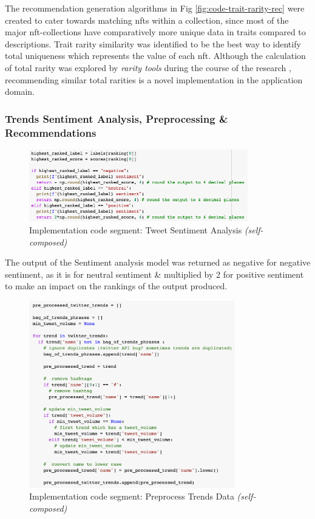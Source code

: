 The recommendation generation algorithms in Fig \ref{fig:code-trait-rarity-rec} were created to cater towards matching \gls{nft}s within a collection, since most of the major \gls{nft}-collections have comparatively more unique data in traits compared to descriptions. Trait rarity similarity was identified to be the best way to identify total uniqueness which represents the value of each \gls{nft}. Although the calculation of total rarity was explored by \textit{rarity tools} during the course of the research \autocite{raritytools_introducing_2021,raritytools_ranking_2021}, recommending similar total rarities is a novel implementation in the application domain.

\subsubsection{Trends Sentiment Analysis, Preprocessing \& Recommendations}

\begin{figure}[h!]
\centering
\includegraphics[width=0.85\textwidth]{images/Implementation/code/sentiment-decision.png}
\caption{Implementation code segment: Tweet Sentiment Analysis \textit{(self-composed)}}
\label{fig:code-tweet-sentiment-analysis}
\end{figure}

The output of the Sentiment analysis model was returned as negative for negative sentiment, as it is for neutral sentiment \& multiplied by 2 for positive sentiment to make an impact on the rankings of the output produced.

\begin{figure}[h!]
\centering
\includegraphics[width=0.8\textwidth]{images/Implementation/code/pre-process twitter trends.png}
\caption{Implementation code segment: Preprocess Trends Data \textit{(self-composed)}}
\label{fig:code-preprocess-trends}
\end{figure}

